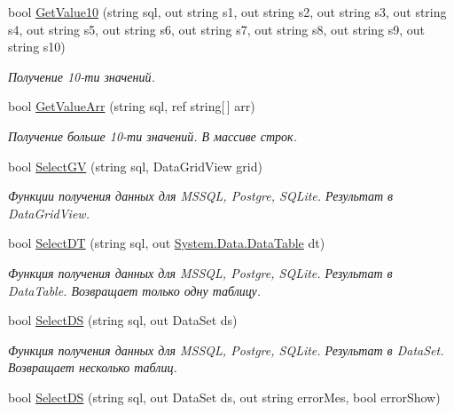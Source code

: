 \begin{DoxyCompactItemize}
bool \mbox{\hyperlink{class_f_b_a_1_1_connection_acc4bb0104ca9cb3f480999e5ab9a3116}{Get\+Value10}} (string sql, out string s1, out string s2, out string s3, out string s4, out string s5, out string s6, out string s7, out string s8, out string s9, out string s10)
\begin{DoxyCompactList}\small\item\em Получение 10-\/ти значений. \end{DoxyCompactList}\item 
bool \mbox{\hyperlink{class_f_b_a_1_1_connection_a49b48dd82db1f15bdaa4ede9eab9c2cc}{Get\+Value\+Arr}} (string sql, ref string\mbox{[}$\,$\mbox{]} arr)
\begin{DoxyCompactList}\small\item\em Получение больше 10-\/ти значений. В массиве строк. \end{DoxyCompactList}\item 
bool \mbox{\hyperlink{class_f_b_a_1_1_connection_ab741e12a89628ff1afe3aa50e019d836}{Select\+GV}} (string sql, Data\+Grid\+View grid)
\begin{DoxyCompactList}\small\item\em Функции получения данных для M\+S\+S\+QL, Postgre, S\+Q\+Lite. Результат в Data\+Grid\+View. ~\newline
\end{DoxyCompactList}\item 
bool \mbox{\hyperlink{class_f_b_a_1_1_connection_a17c79b7810deb7e632187a146a27d725}{Select\+DT}} (string sql, out \mbox{\hyperlink{_sys_static_8cs_a6542cfcff2f8e81f06ade15aa0bfe2b7}{System.\+Data.\+Data\+Table}} dt)
\begin{DoxyCompactList}\small\item\em Функция получения данных для M\+S\+S\+QL, Postgre, S\+Q\+Lite. Результат в Data\+Table. Возвращает только одну таблицу. ~\newline
\end{DoxyCompactList}\item 
bool \mbox{\hyperlink{class_f_b_a_1_1_connection_a05684a6c70de969923339bbaebe82f5f}{Select\+DS}} (string sql, out Data\+Set ds)
\begin{DoxyCompactList}\small\item\em Функция получения данных для M\+S\+S\+QL, Postgre, S\+Q\+Lite. Результат в Data\+Set. Возвращает несколько таблиц. \end{DoxyCompactList}\item 
bool \mbox{\hyperlink{class_f_b_a_1_1_connection_ae384f24ee6f026cd580a76202560445a}{Select\+DS}} (string sql, out Data\+Set ds, out string error\+Mes, bool error\+Show)

\end{DoxyCompactItemize}
